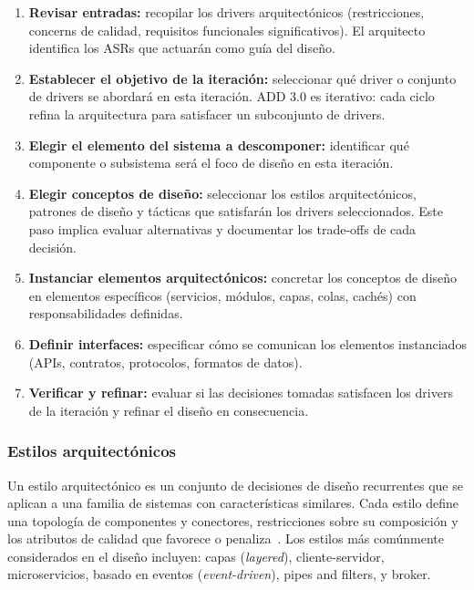 \documentclass[12pt, letterpaper, oneside]{article}
\begin{document}
\begin{enumerate}
\item \textbf{Revisar entradas:} recopilar los drivers arquitectónicos
(restricciones, concerns de calidad, requisitos funcionales significativos). El
arquitecto identifica los ASRs que actuarán como guía del diseño.

\item \textbf{Establecer el objetivo de la iteración:} seleccionar qué driver o
conjunto de drivers se abordará en esta iteración. ADD 3.0 es iterativo: cada
ciclo refina la arquitectura para satisfacer un subconjunto de drivers.

\item \textbf{Elegir el elemento del sistema a descomponer:} identificar qué
componente o subsistema será el foco de diseño en esta iteración.

\item \textbf{Elegir conceptos de diseño:} seleccionar los estilos
arquitectónicos, patrones de diseño y tácticas que satisfarán los drivers
seleccionados. Este paso implica evaluar alternativas y documentar los trade-offs
de cada decisión.

\item \textbf{Instanciar elementos arquitectónicos:} concretar los conceptos de
diseño en elementos específicos (servicios, módulos, capas, colas, cachés) con
responsabilidades definidas.

\item \textbf{Definir interfaces:} especificar cómo se comunican los elementos
instanciados (APIs, contratos, protocolos, formatos de datos).

\item \textbf{Verificar y refinar:} evaluar si las decisiones tomadas satisfacen
los drivers de la iteración y refinar el diseño en consecuencia.
\end{enumerate}

\subsubsection{Estilos arquitectónicos}

Un estilo arquitectónico es un conjunto de decisiones de diseño recurrentes que
se aplican a una familia de sistemas con características similares. Cada estilo
define una topología de componentes y conectores, restricciones sobre su
composición y los atributos de calidad que favorece o
penaliza~\cite{bass2021software}. Los estilos más comúnmente considerados en el
diseño incluyen: capas (\emph{layered}), cliente-servidor, microservicios, basado
en eventos (\emph{event-driven}), pipes and filters, y broker.
\end{document}
